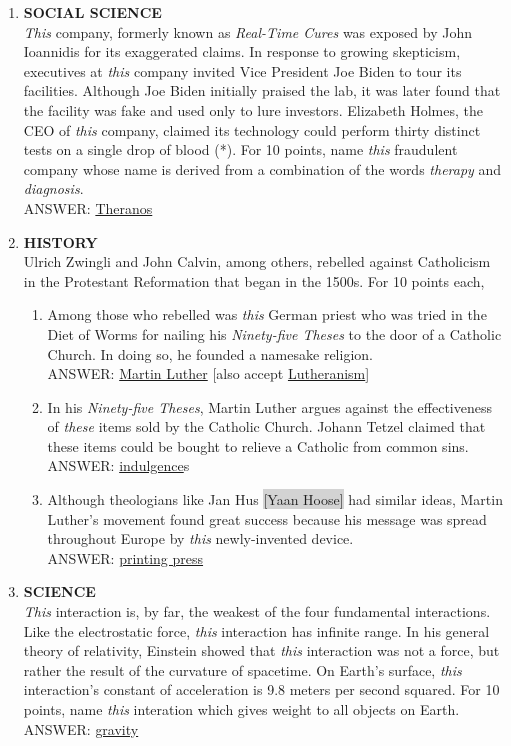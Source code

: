 \documentclass{report}
\newcommand*{\backtrack}{\setcounter{enumi}{\numexpr\theenumi-1\relax}}
\begin{document}
\begin{enumerate}
    \item \textbf{SOCIAL SCIENCE} \\ \textit{This} company, formerly known as \textit{Real-Time Cures} was exposed by John Ioannidis for its exaggerated claims. In response to growing skepticism, executives at \textit{this} company invited Vice President Joe Biden to tour its facilities. Although Joe Biden initially praised the lab, it was later found that the facility was fake and used only to lure investors. Elizabeth Holmes, the CEO of \textit{this} company, claimed its technology could perform thirty distinct tests on a single drop of blood (*). For 10 points, name \textit{this} fraudulent company whose name is derived from a combination of the words \textit{therapy} and \textit{diagnosis}. \\ ANSWER: \underline{Theranos} \backtrack
    \item \textbf{HISTORY} \\ Ulrich Zwingli and John Calvin, among others, rebelled against Catholicism in the Protestant Reformation that began in the 1500s. For 10 points each,
    \begin{enumerate}[label=\Alph*]
        \item Among those who rebelled was \textit{this} German priest who was tried in the Diet of Worms for nailing his \textit{Ninety-five Theses} to the door of a Catholic Church. In doing so, he founded a namesake religion. \\ ANSWER: \underline{Martin Luther} [also accept \underline{Lutheranism}]
        \item In his \textit{Ninety-five Theses}, Martin Luther argues against the effectiveness of \textit{these} items sold by the Catholic Church. Johann Tetzel claimed that these items could be bought to relieve a Catholic from common sins. \\ ANSWER: \underline{indulgence}s
        \item Although theologians like Jan Hus \colorbox{lightGray}{[Yaan Hoose]} had similar ideas, Martin Luther's movement found great success because his message was spread throughout Europe by \textit{this} newly-invented device. \\ ANSWER: \underline{printing press}
    \end{enumerate}

    \item \textbf{SCIENCE} \\ \textit{This} interaction is, by far, the weakest of the four fundamental interactions. Like the electrostatic force, \textit{this} interaction has infinite range. In his general theory of relativity, Einstein showed that \textit{this} interaction was not a force, but rather the result of the curvature of spacetime. On Earth's surface, \textit{this} interaction's constant of acceleration is 9.8 meters per second squared. For 10 points, name \textit{this} interation which gives weight to all objects on Earth. \\ ANSWER: \underline{gravity}

\end{enumerate}
\end{document}
